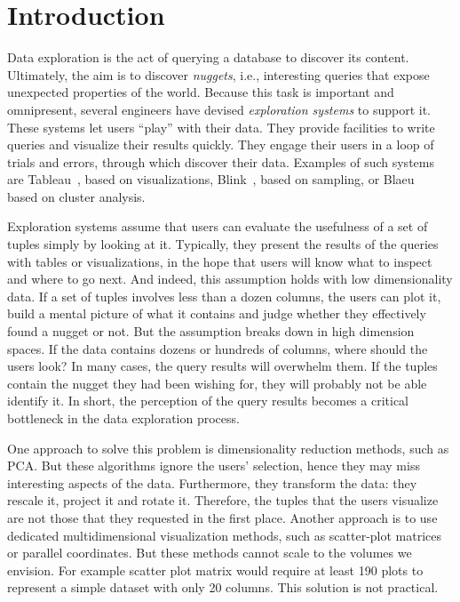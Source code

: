 \section{Introduction}
\label{sec:intro}

Data exploration is the act of querying a database to discover its content.
Ultimately, the aim is to discover \emph{nuggets}, i.e., interesting queries
that expose unexpected properties of the world.  Because this task
is important and omnipresent, several engineers have devised \emph{exploration
systems} to support it. These systems let users ``play'' with their data. They
provide facilities to write queries and visualize their results quickly.
They engage their users in a loop of trials and errors, through which discover
their data. Examples of such systems are Tableau~\cite{StolteTangHanrahan2002},
based on visualizations, Blink~\cite{agarwal2012blink}, based on sampling, or
Blaeu~\cite{sellamTKDE} based on cluster analysis.

Exploration systems assume that users can evaluate the usefulness of a set of
tuples simply by looking at it. Typically, they present the results of the
queries with tables or visualizations, in the hope that users will know what to
inspect and where to go next. And indeed, this assumption holds with low
dimensionality data. If a set of tuples involves less than a dozen columns, the
users can plot it, build a mental picture of what it contains and judge whether
they effectively found a nugget or not. But the assumption breaks down in high
dimension spaces. If the data contains dozens or hundreds of columns, where
should the users look? In many cases, the query results will overwhelm them.
If the tuples contain the nugget they had been wishing for, they will
probably not be able identify it. In short, the perception of the query results becomes
a critical bottleneck in the data exploration process.

One approach to solve this problem is dimensionality reduction methods, such as
PCA. But these algorithms ignore the users' selection, hence they may miss
interesting aspects of the data. Furthermore, they transform the data: they
rescale it, project it and rotate it.  Therefore, the tuples that the users
visualize are not those that they requested in the first place. Another
approach is to use dedicated multidimensional visualization methods, such as
scatter-plot matrices or parallel coordinates. But these methods cannot scale
to the volumes we envision. For example scatter plot matrix would require at
least 190 plots to represent a simple dataset with only 20 columns. This
solution is not practical.

